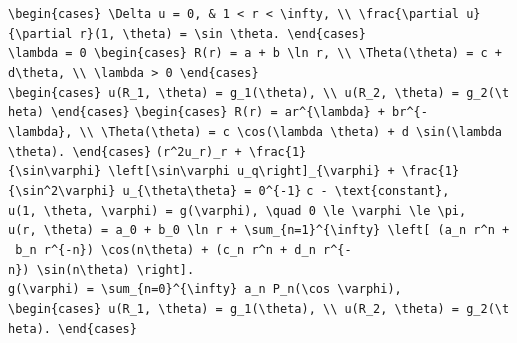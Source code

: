\documentclass[
  ukrainian,
]{article}
\begin{document}
\texttt{\textbackslash{}begin\{cases\}\ \textbackslash{}Delta\ u\ =\ 0,\ \&\ 1\ \textless{}\ r\ \textless{}\ \textbackslash{}infty,\ \textbackslash{}\textbackslash{}\ \textbackslash{}frac\{\textbackslash{}partial\ u\}\{\textbackslash{}partial\ r\}(1,\ \textbackslash{}theta)\ =\ \textbackslash{}sin\ \textbackslash{}theta.\ \textbackslash{}end\{cases\}}
\texttt{\textbackslash{}lambda\ =\ 0\ \textbackslash{}begin\{cases\}\ R(r)\ =\ a\ +\ b\ \textbackslash{}ln\ r,\ \textbackslash{}\textbackslash{}\ \textbackslash{}Theta(\textbackslash{}theta)\ =\ c\ +\ d\textbackslash{}theta,\ \textbackslash{}\textbackslash{}\ \textbackslash{}lambda\ \textgreater{}\ 0\ \textbackslash{}end\{cases\}}
\texttt{\textbackslash{}begin\{cases\}\ u(R\_1,\ \textbackslash{}theta)\ =\ g\_1(\textbackslash{}theta),\ \textbackslash{}\textbackslash{}\ u(R\_2,\ \textbackslash{}theta)\ =\ g\_2(\textbackslash{}theta)\ \textbackslash{}end\{cases\}}
\texttt{\textbackslash{}begin\{cases\}\ R(r)\ =\ ar\^{}\{\textbackslash{}lambda\}\ +\ br\^{}\{-\textbackslash{}lambda\},\ \textbackslash{}\textbackslash{}\ \textbackslash{}Theta(\textbackslash{}theta)\ =\ c\ \textbackslash{}cos(\textbackslash{}lambda\ \textbackslash{}theta)\ +\ d\ \textbackslash{}sin(\textbackslash{}lambda\ \textbackslash{}theta).\ \textbackslash{}end\{cases\}}
\texttt{(r\^{}2u\_r)\_r\ +\ \textbackslash{}frac\{1\}\{\textbackslash{}sin\textbackslash{}varphi\}\ \textbackslash{}left{[}\textbackslash{}sin\textbackslash{}varphi\ u\_q\textbackslash{}right{]}\_\{\textbackslash{}varphi\}\ +\ \textbackslash{}frac\{1\}\{\textbackslash{}sin\^{}2\textbackslash{}varphi\}\ u\_\{\textbackslash{}theta\textbackslash{}theta\}\ =\ 0\^{}\{-1\}}
\texttt{c\ -\ \textbackslash{}text\{constant\},}
\texttt{u(1,\ \textbackslash{}theta,\ \textbackslash{}varphi)\ =\ g(\textbackslash{}varphi),\ \textbackslash{}quad\ 0\ \textbackslash{}le\ \textbackslash{}varphi\ \textbackslash{}le\ \textbackslash{}pi,}
\texttt{u(r,\ \textbackslash{}theta)\ =\ a\_0\ +\ b\_0\ \textbackslash{}ln\ r\ +\ \textbackslash{}sum\_\{n=1\}\^{}\{\textbackslash{}infty\}\ \textbackslash{}left{[}\ (a\_n\ r\^{}n\ +\ b\_n\ r\^{}\{-n\})\ \textbackslash{}cos(n\textbackslash{}theta)\ +\ (c\_n\ r\^{}n\ +\ d\_n\ r\^{}\{-n\})\ \textbackslash{}sin(n\textbackslash{}theta)\ \textbackslash{}right{]}.}
\texttt{g(\textbackslash{}varphi)\ =\ \textbackslash{}sum\_\{n=0\}\^{}\{\textbackslash{}infty\}\ a\_n\ P\_n(\textbackslash{}cos\ \textbackslash{}varphi),}
\texttt{\textbackslash{}begin\{cases\}\ u(R\_1,\ \textbackslash{}theta)\ =\ g\_1(\textbackslash{}theta),\ \textbackslash{}\textbackslash{}\ u(R\_2,\ \textbackslash{}theta)\ =\ g\_2(\textbackslash{}theta).\ \textbackslash{}end\{cases\}}
\end{document}
